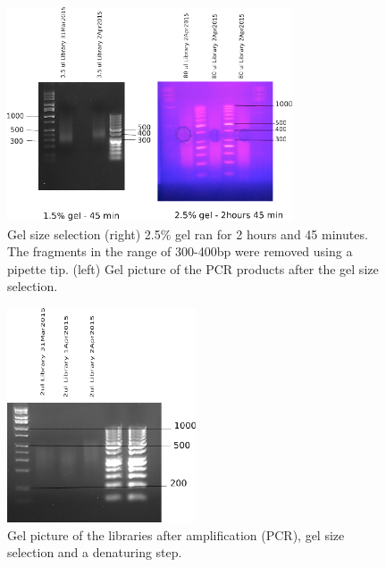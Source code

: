 \documentclass[11pt, oneside]{article}
\begin{document}
				\begin{figure}[h]
					\begin{center}
						\includegraphics[height=2.5in]{./images/gel_sizeselection.pdf}
						\caption[Gel size selection] { Gel size selection (right) 2.5\% gel ran for 2 hours and 45 minutes. The fragments in the range of 300-400bp were removed using a pipette tip. (left) Gel picture of the PCR products after the gel size selection.}
					\end{center}
				\end{figure}


				\begin{figure}[H]
					\begin{center}
						\includegraphics[height=2.5in]{./images/gel_sizeselection_denaturelast.pdf}
						\caption[Denaturing before size selection] {Gel picture of the libraries after amplification (PCR), gel size selection and a 							denaturing step.}
					\end{center}
				\end{figure}
		
\end{document}

